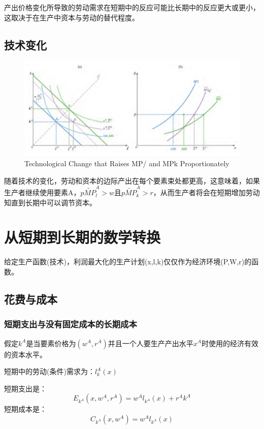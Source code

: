 \documentclass{article}
\begin{document}
产出价格变化所导致的劳动需求在短期中的反应可能比长期中的反应更大或更小，这取决于在生产中资本与劳动的替代程度。

\subsection{技术变化}

\begin{figure}[H] %
	\centering %
	\includegraphics[width=1\textwidth]{13_12} %
	\caption{Technological Change that Raises MP/ and MPk Proportionately} %
	\label{Fig.main13} %
\end{figure}

随着技术的变化，劳动和资本的边际产出在每个要素束处都更高，这意味着，如果生产者继续使用要素A，$ p\widetilde{MP}^A_l>w $且$ p\widetilde{MP}^A_k>r $，从而生产者将会在短期增加劳动知直到长期中可以调节资本。

\section{从短期到长期的数学转换}
给定生产函数(技术)，利润最大化的生产计划(x,l,k)仅仅作为经济环境(P,W,r)的函数。

\subsection{花费与成本}
\subsubsection{短期支出与没有固定成本的长期成本}
假定$ k^A $是当要素价格为$ (w^A,r^A) $并且一个人要生产产出水平$ x^A $时使用的经济有效的资本水平。

短期中的劳动(条件)需求为：$ l_k^A(x) $

短期支出是：
\[
E_{k^A}(x,w^A,r^A)=w^Al_{k^A}(x)+r^Ak^A
\]
短期成本是：
\[
C_{k^A}(x,w^A)=w^Al_{k^A}(x)
\]
\end{document}
